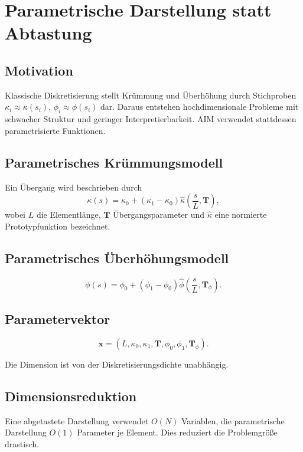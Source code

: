 \section{Parametrische Darstellung statt Abtastung}
\subsection{Motivation}
Klassische Diskretisierung stellt Krümmung und Überhöhung durch Stichproben
\(\kappa_i\approx\kappa(s_i)\), \(\phi_i\approx\phi(s_i)\) dar. Daraus entstehen
hochdimensionale Probleme mit schwacher Struktur und geringer
Interpretierbarkeit. AIM verwendet stattdessen parametrisierte Funktionen.

\subsection{Parametrisches Krümmungsmodell}
\begin{definition}
Ein Übergang wird beschrieben durch
\[
\kappa(s)=\kappa_0+(\kappa_1-\kappa_0)
\widehat\kappa\!\left(\frac{s}{L},\mathbf T\right),
\]
wobei \(L\) die Elementlänge, \(\mathbf T\) Übergangsparameter und
\(\widehat\kappa\) eine normierte Prototypfunktion bezeichnet.
\end{definition}

\subsection{Parametrisches Überhöhungsmodell}
\begin{definition}
\[
\phi(s)=\phi_0+(\phi_1-\phi_0)
\widehat\phi\!\left(\frac{s}{L},\mathbf T_\phi\right).
\]
\end{definition}

\subsection{Parametervektor}
\begin{definition}
\[
\mathbf x=(L,\kappa_0,\kappa_1,\mathbf T,\phi_0,\phi_1,\mathbf T_\phi).
\]
\end{definition}
Die Dimension ist von der Diskretisierungsdichte unabhängig.

\subsection{Dimensionsreduktion}
Eine abgetastete Darstellung verwendet \(O(N)\) Variablen, die parametrische
Darstellung \(O(1)\) Parameter je Element. Dies reduziert die Problemgröße
drastisch.

